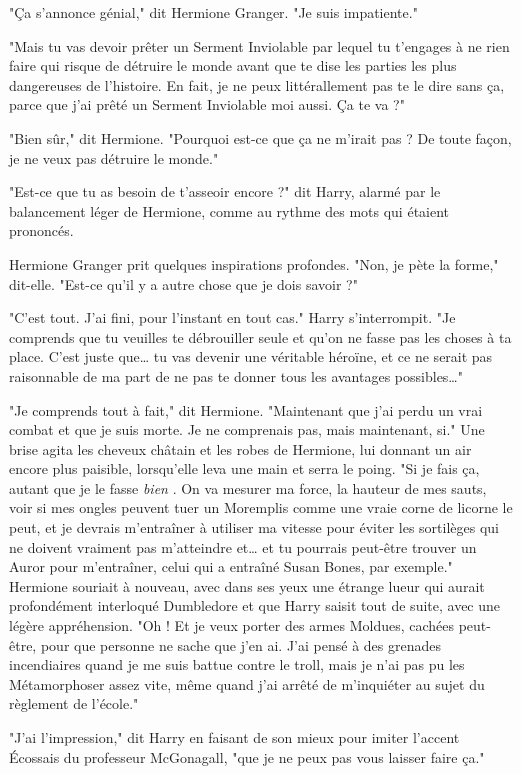 "Ça s'annonce génial," dit Hermione Granger. "Je suis impatiente."

"Mais tu vas devoir prêter un Serment Inviolable par lequel tu t'engages à ne rien faire qui risque de détruire le monde avant que te dise les parties les plus dangereuses de l'histoire. En fait, je ne peux littérallement pas te le dire sans ça, parce que j'ai prêté un Serment Inviolable moi aussi. Ça te va ?"

"Bien sûr," dit Hermione. "Pourquoi est-ce que ça ne m'irait pas ? De toute façon, je ne veux pas détruire le monde."

"Est-ce que tu as besoin de t'asseoir encore ?" dit Harry, alarmé par le balancement léger de Hermione, comme au rythme des mots qui étaient prononcés.

Hermione Granger prit quelques inspirations profondes. "Non, je pète la forme," dit-elle. "Est-ce qu'il y a autre chose que je dois savoir ?"

"C'est tout. J'ai fini, pour l'instant en tout cas." Harry s'interrompit. "Je comprends que tu veuilles te débrouiller seule et qu'on ne fasse pas les choses à ta place. C'est juste que… tu vas devenir une véritable héroïne, et ce ne serait pas raisonnable de ma part de ne pas te donner tous les avantages possibles…"

"Je comprends tout à fait," dit Hermione. "Maintenant que j'ai perdu un vrai combat et que je suis morte. Je ne comprenais pas, mais maintenant, si." Une brise agita les cheveux châtain et les robes de Hermione, lui donnant un air encore plus paisible, lorsqu'elle leva une main et serra le poing. "Si je fais ça, autant que je le fasse \emph{bien} . On va mesurer ma force, la hauteur de mes sauts, voir si mes ongles peuvent tuer un Moremplis comme une vraie corne de licorne le peut, et je devrais m'entraîner à utiliser ma vitesse pour éviter les sortilèges qui ne doivent vraiment pas m'atteindre et… et tu pourrais peut-être trouver un Auror pour m'entraîner, celui qui a entraîné Susan Bones, par exemple." Hermione souriait à nouveau, avec dans ses yeux une étrange lueur qui aurait profondément interloqué Dumbledore et que Harry saisit tout de suite, avec une légère appréhension. "Oh ! Et je veux porter des armes Moldues, cachées peut-être, pour que personne ne sache que j'en ai. J'ai pensé à des grenades incendiaires quand je me suis battue contre le troll, mais je n'ai pas pu les Métamorphoser assez vite, même quand j'ai arrêté de m'inquiéter au sujet du règlement de l'école."

"J'ai l'impression," dit Harry en faisant de son mieux pour imiter l'accent Écossais du professeur McGonagall, "que je ne peux pas vous laisser faire ça."

